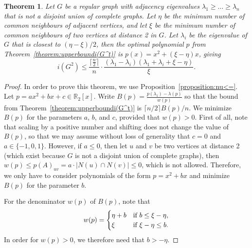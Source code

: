 \documentclass[a4paper,11pt]{article}
\newtheorem{theorem}{Theorem}[section]
\theoremstyle{definition}
\def\R{\mathbb R}
\begin{document}
\begin{theorem}\label{theorem:upperboundi(G^2)closed}
    Let $G$ be a regular graph with adjacency eigenvalues $\lambda_1\ge \dots \ge \lambda_n$ that is not a disjoint union of complete graphs. Let $\eta$ be the minimum number of common neighbours of adjacent vertices, and let $\xi$ be the minimum number of common neighbours of two vertices at distance 2 in $G$. Let $\lambda_i$ be the eigenvalue of $G$ that is closest to $(\eta-\xi)/2$, then the optimal polynomial $p$ from Theorem~\ref{theorem:upperboundi(G^t)} is $p(x)=x^2+(\xi-\eta)x$, giving
    $$i(G^2) \le \frac{\lceil \frac n 2 \rceil}{n} \cdot \frac{(\lambda_1-\lambda_i)(\lambda_1+\lambda_i+\xi-\eta)}{\xi}.$$
\end{theorem}

\begin{proof}
In order to prove this theorem, we use Proposition~\ref{proposition:nu<=}. Let $p=ax^2+bx+c \in \R_2[x]$. Write $B(p)=\frac{p(\lambda_1)-\lambda(p)}{w(p)}$ so that the bound from Theorem~\ref{theorem:upperboundi(G^t)} is $\lceil n/2 \rceil B(p)/n$. We minimize $B(p)$ for the parameters $a$, $b$, and $c$, provided that $w(p)>0$. First of all, note that scaling by a positive number and shifting does not change the value of $B(p)$, so that we may assume without loss of generality that $c=0$ and $a\in \{-1,0,1\}$. However, if $a\le 0$, then let $u$ and $v$ be two vertices at distance 2 (which exist because $G$ is not a disjoint union of complete graphs), then $w(p)\le p(A)_{uv}=a\cdot |N(u) \cap N(v)| \le 0$, which is not allowed. Therefore, we only have to consider polynomials of the form $p=x^2+bx$ and minimize $B(p)$ for the parameter $b$.

    For the denominator $w(p)$ of $B(p)$, note that
    \[
    w(p)=\begin{cases}
        \eta+b &$if $b\le\xi-\eta,\\
        \xi &$if $\xi -\eta \le b.
    \end{cases}
    \]
    In order for $w(p)>0$, we therefore need that $b> -\eta$.


\end{proof}
\end{document}
